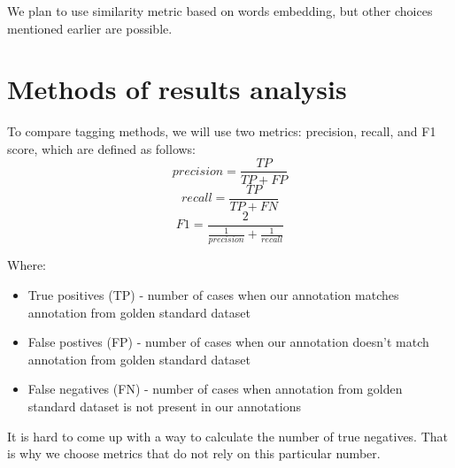 \documentclass[11pt]{article}
\begin{document}
We plan to use similarity metric based on words embedding, but other choices mentioned earlier are possible.

\section{Methods of results analysis}
To compare tagging methods, we will use two metrics: precision, recall, and F1 score, which are defined as follows:    
\begin{equation}
    precision = \frac{TP}{TP + FP} 
\end{equation}
\begin{equation}
    recall = \frac{TP}{TP + FN} 
\end{equation}
\begin{equation}
    F1 = \frac{2}{\frac{1}{precision} + \frac{1}{recall}} 
\end{equation}

Where:
\begin{itemize}
    \item True positives (TP) - number of cases when our annotation matches annotation from golden standard dataset
    \item False postives (FP) - number of cases when our annotation doesn't match annotation from golden standard dataset
    \item False negatives (FN) - number of cases when annotation from golden standard dataset is not present in our annotations
\end{itemize}
It is hard to come up with a way to calculate the number of true negatives. That is why we choose metrics that do not rely on this particular number. 


%
%


\end{document}
